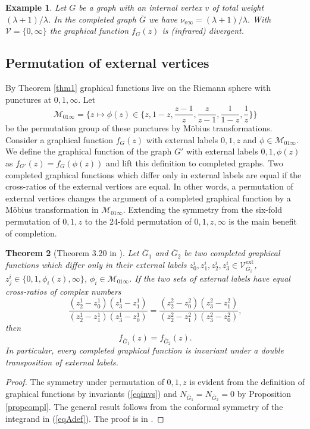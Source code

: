 \documentclass[oneside]{amsart}
\newcommand{\Gg}{{\overline{G}}}
\newcommand{\sM}{\mathcal{M}}
\newcommand{\sV}{\mathcal{V}}
\theoremstyle{plain}
\newtheorem{thm}{Theorem}
\newtheorem{ex}[thm]{Example}
\begin{document}
\begin{ex}\label{indiv}
Let $G$ be a graph with an internal vertex $v$ of total weight $(\lambda+1)/\lambda$. In the completed graph $\Gg$ we have $\nu_{v\infty}=(\lambda+1)/\lambda$.
With $\sV=\{0,\infty\}$ the graphical function $f_G(z)$ is (infrared) divergent.
\end{ex}

\subsection{Permutation of external vertices}\label{sectperm}
By Theorem \ref{thm1} graphical functions live on the Riemann sphere with punctures at $0,1,\infty$. Let
\begin{equation}
\sM_{01\infty}=\Big\{z\mapsto\phi(z)\in\Big\{z,1-z,\frac{z-1}{z},\frac{z}{z-1},\frac{1}{1-z},\frac{1}{z}\Big\}\Big\}
\end{equation}
be the permutation group of these punctures by M\"obius transformations. Consider a graphical function $f_G(z)$ with external labels $0,1,z$ and $\phi\in\sM_{01\infty}$.
We define the graphical function of the graph $G'$ with external labels $0,1,\phi(z)$ as $f_{G'}(z)=f_G(\phi(z))$ and lift this definition to completed graphs.
Two completed graphical functions which differ only in external labels are equal if the cross-ratios of the external vertices are equal. In other words, a permutation of external vertices
changes the argument of a completed graphical function by a M\"obius transformation in $\sM_{01\infty}$. Extending the symmetry from the six-fold permutation of $0,1,z$ to the 24-fold
permutation of $0,1,z,\infty$ is the main benefit of completion.

\begin{thm}[Theorem 3.20 in \cite{gf}]\label{thmperm}
Let $\Gg_1$ and $\Gg_2$ be two completed graphical functions which differ only in their external labels $z_0^i,z_1^i,z_2^i,z_3^i\in\sV_{\Gg_i}^{\mathrm{ext}}$,
$z^i_j\in\{0,1,\phi_i(z),\infty\}$, $\phi_i\in\sM_{01\infty}$. If the two sets of external labels have equal cross-ratios of complex numbers
\begin{equation}\label{eqcross}
\frac{(z^1_2-z^1_0)(z^1_3-z^1_1)}{(z^1_2-z^1_1)(z^1_3-z^1_0)}=\frac{(z^2_2-z^2_0)(z^2_3-z^2_1)}{(z^2_2-z^2_1)(z^2_3-z^2_0)},
\end{equation}
then
\begin{equation}\label{eqperm}
f_{\Gg_1}(z)=f_{\Gg_2}(z).
\end{equation}
In particular, every completed graphical function is invariant under a double transposition of external labels.
\end{thm}
\begin{proof}
The symmetry under permutation of $0,1,z$ is evident from the definition of graphical functions by invariants (\ref{eqinvs}) and $N_{\Gg_1}=N_{\Gg_2}=0$ by Proposition \ref{propcompl}.
The general result follows from the conformal symmetry of the integrand in (\ref{eqAdef}). The proof is in \cite{gf}.
\end{proof}
\end{document}
